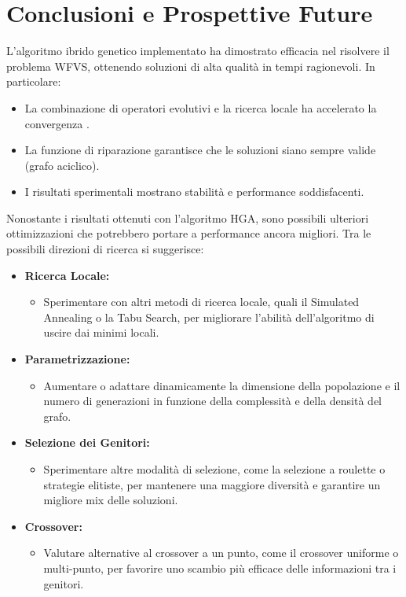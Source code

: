 \documentclass[a4paper,12pt]{article}
\begin{document}
\newpage

\section{Conclusioni e Prospettive Future}
L'algoritmo ibrido genetico implementato ha dimostrato efficacia nel risolvere il problema WFVS, ottenendo soluzioni di alta qualità in tempi ragionevoli. In particolare:
\begin{itemize}
    \item La combinazione di operatori evolutivi e la ricerca locale ha accelerato la convergenza .
    \item La funzione di riparazione garantisce che le soluzioni siano sempre valide (grafo aciclico).
    \item I risultati sperimentali mostrano stabilità e performance soddisfacenti.
\end{itemize}


Nonostante i risultati ottenuti con l'algoritmo HGA, sono possibili ulteriori ottimizzazioni che potrebbero portare a performance ancora migliori. Tra le possibili direzioni di ricerca si suggerisce:

\begin{itemize}
    \item \textbf{Ricerca Locale:} 
    \begin{itemize}
        \item Sperimentare con altri metodi di ricerca locale, quali il Simulated Annealing o la Tabu Search, per migliorare l'abilità dell'algoritmo di uscire dai minimi locali.
    \end{itemize}
    \item \textbf{Parametrizzazione:}
    \begin{itemize}
        \item Aumentare o adattare dinamicamente la dimensione della popolazione e il numero di generazioni in funzione della complessità e della densità del grafo.
    \end{itemize}
    \item \textbf{Selezione dei Genitori:}
    \begin{itemize}
        \item Sperimentare altre modalità di selezione, come la selezione a roulette o strategie elitiste, per mantenere una maggiore diversità e garantire un migliore mix delle soluzioni.
    \end{itemize}
    \item \textbf{Crossover:}
    \begin{itemize}
        \item Valutare alternative al crossover a un punto, come il crossover uniforme o multi-punto, per favorire uno scambio più efficace delle informazioni tra i genitori.
    \end{itemize}
\end{itemize}
\end{document}
